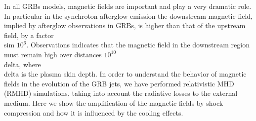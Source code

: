 


\bigskip



\bigskip

\noindent In all GRBs models, magnetic fields are important and play a very dramatic
role. In particular in the synchroton afterglow emission the downstream
magnetic field, implied by afterglow observations in GRBs, is higher than
that of the upstream field, by a factor \\sim $10^6$. Observations
indicates that the magnetic field in the downstream region must remain high
over distances $10^{10}$ \\delta, where \\delta is the plasma skin depth. In order to understand the behavior of magnetic fields in the evolution of the GRB jets, we have performed relativistic MHD (RMHD) simulations, taking into account the radiative losses to the external medium. Here we show the amplification of the magnetic fields by shock compression and how it is influenced by the cooling effects.
